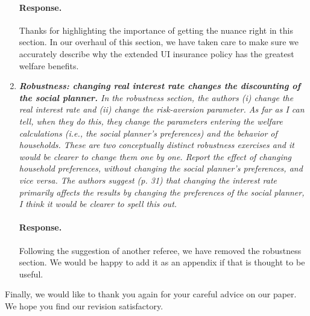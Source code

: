 \documentclass[12pt,letterpaper,english]{article}
\begin{document}
\begin{enumerate}
	\paragraph{Response.} Thanks for highlighting the importance of getting the nuance right in this section. In our overhaul of this section, we have taken care to make sure we accurately describe why the extended UI insurance policy has the greatest welfare benefits.

	\item \textit{\textbf{Robustness: changing real interest rate changes the discounting of the social planner.} In the robustness section, the authors (i) change the real interest rate and (ii) change the risk-aversion parameter. As far as I can tell, when they do this, they change the parameters entering the welfare calculations (i.e., the social planner’s preferences) and the behavior of households. These are two conceptually distinct robustness exercises and it would be clearer to change them one by one. Report the effect of changing household preferences, without changing the social planner’s preferences, and vice versa. The authors suggest (p. 31) that		changing the interest rate primarily affects the results by changing the preferences of the social planner, I think it would be clearer to spell	this out.}
	
	\paragraph{Response.} Following the suggestion of another referee, we have removed the robustness section. We would be happy to add it as an appendix if that is thought to be useful.

\end{enumerate}
	
	
	\bigskip
	
	\noindent Finally, we would like to thank you again for your careful advice on our paper. We hope you find our revision satisfactory.
	


\end{document}
